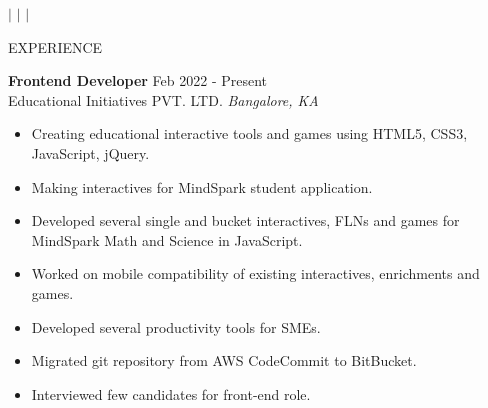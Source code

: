 \documentclass{resume} %
\begin{document}
\vspace{3ex} 
\centerline {\href{https://linkedin.com/in/lomitaswa/}{} $\vert$
\href{https://github.com/lomitaswa/}{} $\vert$
\href{mailto:lomitaswa.suna@hotmail.com}{} $\vert$
\href{https://lomitaswa.me/}{} }
\vspace{2ex} 







\begin{rSection}{EXPERIENCE}

\textbf{Frontend Developer} \hfill Feb 2022 - Present\\
Educational Initiatives PVT. LTD. \hfill \textit{Bangalore, KA}
 \begin{itemize}
    \itemsep -3pt {} 
     \item Creating educational interactive tools and games using HTML5, CSS3, JavaScript, jQuery.
     \item Making interactives for MindSpark student application.
     \item Developed several single and bucket interactives, FLNs and games for MindSpark Math and Science in JavaScript.
     \item Worked on mobile compatibility of existing interactives, enrichments and games.
     \item Developed several productivity tools for SMEs.
     \item Migrated git repository from AWS CodeCommit to BitBucket.
     \item Interviewed few candidates for front-end role.
 \end{itemize}

\end{rSection} 
\end{document}
